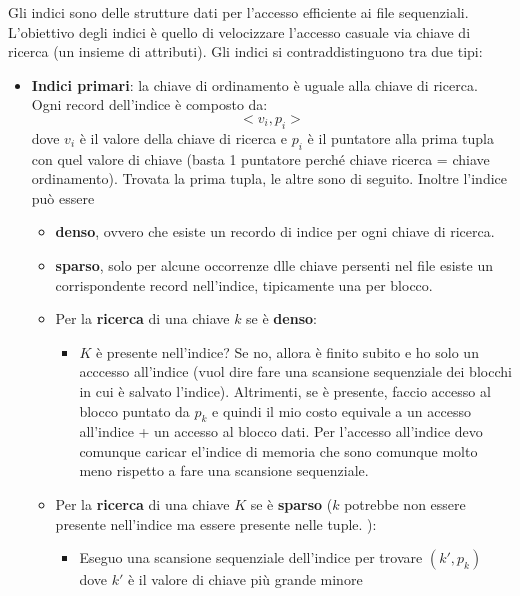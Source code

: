 \documentclass[a4paper]{article}
\begin{document}
Gli indici sono delle strutture dati per l'accesso efficiente ai file sequenziali.
L'obiettivo degli indici è quello di velocizzare l'accesso casuale
via chiave di ricerca (un insieme di attributi).
Gli indici si contraddistinguono tra due tipi:
\begin{itemize}
    \item \textbf{Indici primari}: la chiave di ordinamento è uguale alla chiave di ricerca.
    Ogni record dell'indice è composto da:
    \[
        < v_i, p_i >
    \]
    dove $v_i$ è il valore della chiave di ricerca e $p_i$ è il puntatore
    alla prima tupla con quel valore di chiave (basta 1 puntatore perché chiave
    ricerca = chiave ordinamento). Trovata la prima tupla, le altre sono di seguito.
    Inoltre l'indice può essere
    \begin{itemize}
        \item \textbf{denso}, ovvero che esiste un recordo di indice per ogni chiave di ricerca.
        \item \textbf{sparso}, solo per alcune occorrenze dlle chiave persenti nel file esiste un corrispondente
        record nell'indice, tipicamente una per blocco.
    \end{itemize}
    \begin{itemize}
        \item Per la \textbf{ricerca} di una chiave $k$ se è \textbf{denso}:
        \begin{itemize}
            \item $K$ è presente nell'indice?
            Se no, allora è finito subito e ho solo un acccesso all'indice (vuol dire
            fare una scansione sequenziale dei blocchi in cui è salvato l'indice).
            Altrimenti, se è presente, faccio accesso al blocco puntato da
            $p_k$ e quindi il mio costo equivale a un accesso all'indice +
            un accesso al blocco dati. Per l'accesso all'indice devo comunque
            caricar el'indice di memoria che sono comunque molto meno rispetto
            a fare una scansione sequenziale.
        \end{itemize}
        \item Per la \textbf{ricerca} di una chiave $K$ se è \textbf{sparso} ($k$ potrebbe
        non essere presente nell'indice ma essere presente nelle tuple. ):
        \begin{itemize}
            \item Eseguo una scansione sequenziale dell'indice per trovare $(k', p_k)$
            dove $k'$ è il valore di chiave più grande minore

\end{itemize}
\end{itemize}
\end{itemize}
\end{document}
